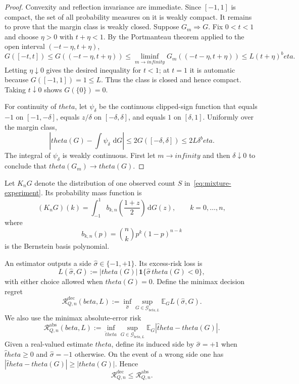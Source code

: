 \documentclass[11pt]{article}
\def\beta{beta}%
\def\theta{theta}%
\def\infty{infinity}%
\newcommand{\E}{\mathbb E}
\newcommand{\one}{\mathbf 1}
\newcommand{\calG}{\mathcal G}
\newcommand{\calR}{\mathcal R}
\newcommand{\dd}{\,\mathrm d}
\begin{document}
\begin{proof}
Convexity and reflection invariance are immediate.  Since $[-1,1]$ is compact, the set of all probability measures on it is weakly compact.  It remains to prove that the margin class is weakly closed.  Suppose $G_m\Rightarrow G$.  Fix $0<t<1$ and choose $\eta>0$ with $t+\eta<1$.  By the Portmanteau theorem applied to the open interval $(-t-\eta,t+\eta)$,
\[
G([-t,t])
\le G((-t-\eta,t+\eta))
\le \liminf_{m\to\infty}G_m((-t-\eta,t+\eta))
\le L(t+\eta)^\beta.
\]
Letting $\eta\downarrow0$ gives the desired inequality for $t<1$; at $t=1$ it is automatic because $G([-1,1])=1\le L$.  Thus the class is closed and hence compact.  Taking $t\downarrow0$ shows $G(\{0\})=0$.

For continuity of $\theta$, let $\psi_\delta$ be the continuous clipped-sign function that equals $-1$ on $[-1,-\delta]$, equals $z/\delta$ on $[-\delta,\delta]$, and equals $1$ on $[\delta,1]$.  Uniformly over the margin class,
\[
\left|\theta(G)-\int\psi_\delta\,\dd G\right|
\le 2G([-\delta,\delta])
\le2L\delta^\beta.
\]
The integral of $\psi_\delta$ is weakly continuous.  First let $m\to\infty$ and then $\delta\downarrow0$ to conclude that $\theta(G_m)\to\theta(G)$.
\end{proof}

Let $K_nG$ denote the distribution of one observed count $S$ in~\eqref{eq:mixture-experiment}.  Its probability mass function is
\begin{equation}
\label{eq:channel}
(K_nG)(k)
=
\int_{-1}^1
b_{k,n}\left(\frac{1+z}{2}\right)\dd G(z),
\qquad k=0,\dots,n,
\end{equation}
where
\[
b_{k,n}(p)=\binom nk p^k(1-p)^{n-k}
\]
is the Bernstein basis polynomial.

An estimator outputs a side $\widehat\sigma\in\{-1,+1\}$.  Its excess-risk loss is
\begin{equation}
\label{eq:decision-loss}
L(\widehat\sigma,G)
:=
|\theta(G)|\,
\one\{\widehat\sigma\,\theta(G)<0\},
\end{equation}
with either choice allowed when $\theta(G)=0$.  Define the minimax decision regret
\begin{equation}
\label{eq:minimax-decision}
\calR^{\mathrm{dec}}_{Q,n}(\beta,L)
:=
\inf_{\widehat\sigma}
\sup_{G\in\calG_{\beta,L}}
\E_G L(\widehat\sigma,G).
\end{equation}
We also use the minimax absolute-error risk
\begin{equation}
\label{eq:minimax-estimation}
\calR^{\mathrm{abs}}_{Q,n}(\beta,L)
:=
\inf_{\widehat\theta}
\sup_{G\in\calG_{\beta,L}}
\E_G|\widehat\theta-\theta(G)|.
\end{equation}
Given a real-valued estimate $\widehat\theta$, define its induced side by $\widehat\sigma=+1$ when $\widehat\theta\ge0$ and $\widehat\sigma=-1$ otherwise.  On the event of a wrong side one has $|\widehat\theta-\theta(G)|\ge|\theta(G)|$.  Hence
\begin{equation}
\label{eq:decision-le-estimation}
\calR^{\mathrm{dec}}_{Q,n}
\le
\calR^{\mathrm{abs}}_{Q,n}.
\end{equation}
\end{document}
